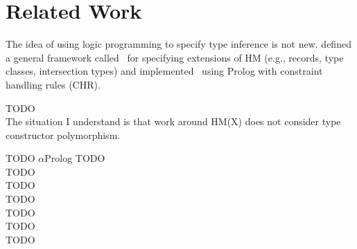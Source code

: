 \section{Related Work}\label{sec:relwork}
The idea of using logic programming to specify type inference is not new.
\citet*{HMX99} defined a general framework called \HMX\ for specifying
extensions of HM (e.g., records, type classes, intersection types)
and \citet{tyinferCHR02} implemented \HMX\ using Prolog with
constraint handling rules (CHR).

TODO\\
The situation I understand is that work around HM(X) does not consider
type constructor polymorphism.

TODO
$\alpha$Prolog
TODO\\
TODO\\
TODO\\
TODO\\
TODO\\
TODO\\
TODO\\

